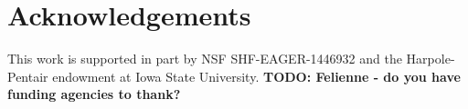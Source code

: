 \documentclass[10pt,conference,compsocconf]{IEEEtran}
\newcommand{\todo}[1]{\textbf{TODO: #1}}
\begin{document}
\balance

\section*{Acknowledgements}
This work is supported in part by  NSF SHF-EAGER-1446932 and the Harpole-Pentair endowment at Iowa State University. \todo{Felienne - do you have funding agencies to thank?}




\end{document}
